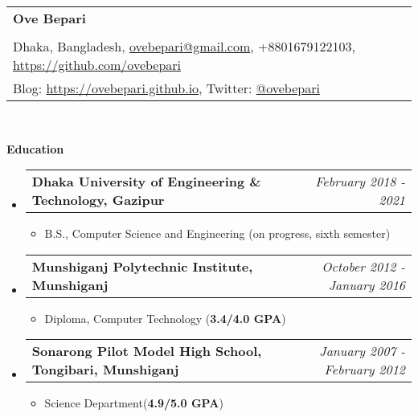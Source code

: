 \documentclass[letterpaper,10pt]{article}
\makeatletter
\newcommand{\resheading}[1]{{\large \colorbox{mygrey}{\begin{minipage}{\textwidth}{\textbf{#1 \vphantom{p\^{E}}}}\end{minipage}}}}
\newcommand{\ressubheading}[4]{
	\begin{tabular*}{7.1in}{l@{\extracolsep{\fill}}r}
		\textbf{#1} & \textit{#4} \\
	\end{tabular*}\vspace{-6pt}}
\makeatother
\begin{document}
	
	\begin{tabular*}{7.5in}{l@{\extracolsep{\fill}}}
		\textbf{\large Ove Bepari}\\
		\\
		
		Dhaka, Bangladesh, \href{mailto:ovebepari@gmail.com}{ovebepari@gmail.com}, +8801679122103, \url{https://github.com/ovebepari} \\
		 Blog: \url{https://ovebepari.github.io}, Twitter: \href{https://twitter.com/ovebepari}{@ovebepari}
	
		\\

	\end{tabular*}
	\\
	
	\vspace{0.3in}
	
	\resheading{Education}
	\begin{itemize}
		
				
		\item \ressubheading{Dhaka University of Engineering \& Technology, Gazipur}{}{}{February 2018 - 2021}
		\begin{itemize}
			\item B.S., Computer Science and Engineering (on progress, sixth semester)
		\end{itemize}
	
				
		\item \ressubheading{Munshiganj Polytechnic Institute, Munshiganj}{}{}{October 2012 - January 2016}
		\begin{itemize}
			\item Diploma, Computer Technology (\textbf{3.4/4.0 GPA})
		\end{itemize}
		
		
		\item \ressubheading{Sonarong Pilot Model High School, Tongibari, Munshiganj}{}{}{January 2007 - February 2012}
		\begin{itemize}
			\item Science Department(\textbf{4.9/5.0 GPA})
		\end{itemize}

	
	\end{itemize}
	
	
	\vspace{0.2in}
	
\end{document}
